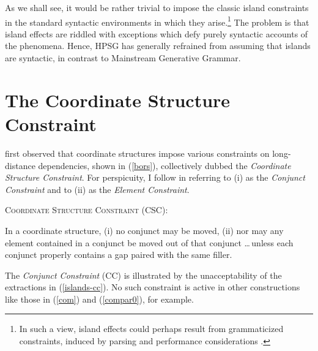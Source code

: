 \documentclass[output=paper
 	        ,biblatex
                ,babelshorthands
                ,newtxmath
                ,draftmode
                ,colorlinks, citecolor=brown
]{langscibook}
\begin{document}
\noindent
As we shall see, it would be rather trivial to impose the classic island constraints in the standard syntactic
environments in which they arise.\footnote{In such a view, island effects could perhaps result from
grammaticized constraints, induced by parsing and performance considerations  
\citep{prichett,fodor78,Fodor83}.}
 The problem is that island effects are riddled with exceptions which
defy purely syntactic accounts of the phenomena.  Hence, HPSG has generally refrained from
assuming that islands are syntactic, in contrast to Mainstream Generative Grammar.


\section{The Coordinate Structure Constraint}

\citet{Ross67} first observed that coordinate structures impose various constraints on long-distance
dependencies, shown in (\ref{bors}), collectively dubbed the \emph{Coordinate Structure
  Constraint}. For perspicuity, I follow \citet{grosu73} in referring to (i) as the \emph{Conjunct
  Constraint} and to (ii) as the \emph{Element Constraint}.

\ea \label{bors}
\textsc{Coordinate Structure Constraint} (CSC):

In a coordinate structure, (i) no conjunct may be moved, (ii) nor may any element contained in a
conjunct be moved out of that conjunct \ldots \,unless each conjunct properly contains a gap paired
with the same filler.  \z

\noindent
The \emph{Conjunct Constraint} (CC) is illustrated by the unacceptability of the extractions in
(\ref{islands-cc}). No such constraint is active in other constructions like those in (\ref{com})
and (\ref{compar0}), for example.
 

\eal
\label{islands-cc}  
\zl 

\eal
\label{com}
\zl
\end{document}
